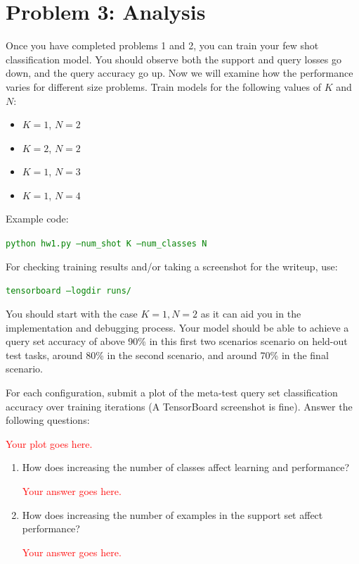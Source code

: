 \documentclass[12pt]{article}
\begin{document}
\section*{Problem 3: Analysis}

Once you have completed problems 1 and 2, you can train your few shot classification model. You should observe both the support and query losses go down, and the query accuracy go up. Now we will examine how the performance varies for different size problems.
Train models for the following values of $K$ and $N$:
\begin{itemize}
    \item $K = 1$, $N=2$ %
    \item $K = 2$, $N=2$ %
    \item $K = 1$, $N=3$ %
    \item $K = 1$, $N=4$ %
\end{itemize}

Example code:

\textcolor{green}{\texttt{python hw1.py --num\_shot K --num\_classes N}}

For checking training results and/or taking a screenshot for the writeup, use:

\textcolor{green}{\texttt{tensorboard --logdir runs/}}

You should start with the case $K=1 , N=2$ as it can aid you in the implementation and debugging process. Your model should be able to achieve a query set accuracy of above 90\% in this first two scenarios scenario on held-out test tasks, around 80\% in the second scenario, and around 70\% in the final scenario.


For each configuration, submit a plot of the meta-test query set classification accuracy over training iterations (A TensorBoard screenshot is fine). Answer the following questions:

\textcolor{red}{Your plot goes here.}

\begin{enumerate}
    \item How does increasing the number of classes affect learning and performance?
    
    \textcolor{red}{Your answer goes here.}
    
    \item How does increasing the number of examples in the support set affect performance?
    
   \textcolor{red}{Your answer goes here.}
    
\end{enumerate}
\end{document}
